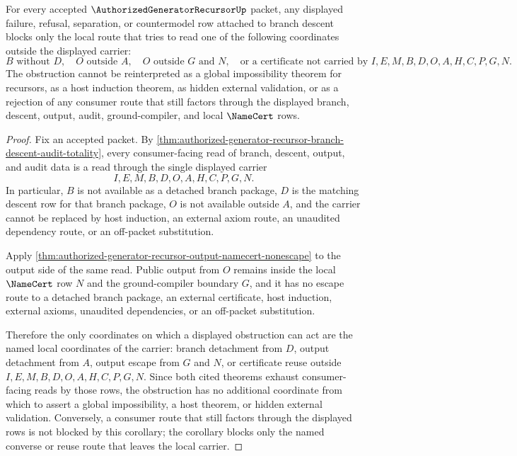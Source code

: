 \begin{corollary}
\label{cor:authorized-generator-recursor-branch-descent-local-obstruction}
For every accepted $\AuthorizedGeneratorRecursorUp$ packet, any displayed failure, refusal, separation, or countermodel row attached to branch descent blocks only the local route that tries to read one of the following coordinates outside the displayed carrier:
$$
B\text{ without }D,\quad O\text{ outside }A,\quad O\text{ outside }G\text{ and }N,\quad \text{or a certificate not carried by }I,E,M,B,D,O,A,H,C,P,G,N.
$$
The obstruction cannot be reinterpreted as a global impossibility theorem for recursors, as a host induction theorem, as hidden external validation, or as a rejection of any consumer route that still factors through the displayed branch, descent, output, audit, ground-compiler, and local $\NameCert$ rows.
\end{corollary}
\begin{proof}
Fix an accepted packet. By \autoref{thm:authorized-generator-recursor-branch-descent-audit-totality}, every consumer-facing read of branch, descent, output, and audit data is a read through the single displayed carrier
$$
I,E,M,B,D,O,A,H,C,P,G,N.
$$
In particular, $B$ is not available as a detached branch package, $D$ is the matching descent row for that branch package, $O$ is not available outside $A$, and the carrier cannot be replaced by host induction, an external axiom route, an unaudited dependency route, or an off-packet substitution.

Apply \autoref{thm:authorized-generator-recursor-output-namecert-nonescape} to the output side of the same read. Public output from $O$ remains inside the local $\NameCert$ row $N$ and the ground-compiler boundary $G$, and it has no escape route to a detached branch package, an external certificate, host induction, external axioms, unaudited dependencies, or an off-packet substitution.

Therefore the only coordinates on which a displayed obstruction can act are the named local coordinates of the carrier: branch detachment from $D$, output detachment from $A$, output escape from $G$ and $N$, or certificate reuse outside $I,E,M,B,D,O,A,H,C,P,G,N$. Since both cited theorems exhaust consumer-facing reads by those rows, the obstruction has no additional coordinate from which to assert a global impossibility, a host theorem, or hidden external validation. Conversely, a consumer route that still factors through the displayed rows is not blocked by this corollary; the corollary blocks only the named converse or reuse route that leaves the local carrier.
\end{proof}
